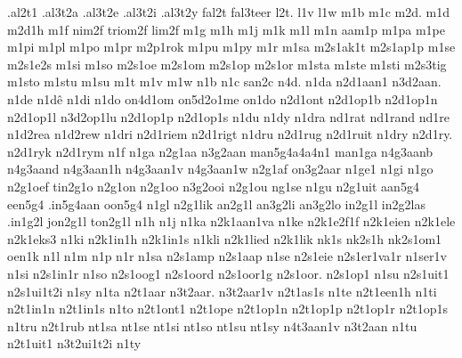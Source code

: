 {.al2t1
.al3t2a
.al3t2e
.al3t2i
.al3t2y
%
fal2t
fal3teer
l2t.
%
l1v
l1w
%
m1b
m1c
m2d.
m1d
m2d1h
m1f
nim2f
triom2f
lim2f
m1g
m1h
m1j
m1k
m1l
m1n
aam1p
m1pa
m1pe
m1pi
m1pl
m1po
m1pr
m2p1rok
m1pu
m1py
m1r
m1sa
m2s1ak1t
m2s1ap1p
m1se
m2s1e2s
m1si
m1so
m2s1oe
m2s1om
m2s1op
m2s1or
m1sta
m1ste
m1sti
m2s3tig
m1sto
m1stu
m1su
m1t
m1v
m1w
%
%
n1b
n1c
san2c
n4d.
n1da
n2d1aan1
n3d2aan.
n1de
n1dê
n1di
n1do
on4d1om
on5d2o1me
on1do
n2d1ont
n2d1op1b
n2d1op1n
n2d1op1l
n3d2op1lu
n2d1op1p
n2d1op1s
n1du
n1dy
n1dra
nd1rat
nd1rand
nd1re
n1d2rea
n1d2rew
n1dri
n2d1riem
n2d1rigt
n1dru
n2d1rug
n2d1ruit
n1dry
n2d1ry.
n2d1ryk
n2d1rym
n1f
%
n1ga
n2g1aa
n3g2aan
man5g4a4a4n1
man1ga
n4g3aanb
n4g3aand
n4g3aan1h
n4g3aan1v
n4g3aan1w
n2g1af
on3g2aar
n1ge1
n1gi
n1go
n2g1oef
tin2g1o
n2g1on
n2g1oo
n3g2ooi
n2g1ou
ng1se
n1gu
n2g1uit
aan5g4
een5g4
.in5g4aan
oon5g4
n1gl
n2g1lik
an2g1l
an3g2li
an3g2lo
in2g1l
in2g2las
.in1g2l
jon2g1l
ton2g1l
%
n1h
n1j
n1ka
n2k1aan1va
n1ke
n2k1e2f1f
n2k1eien
n2k1ele
n2k1eks3
n1ki
n2k1in1h
n2k1in1s
n1kli
n2k1lied
n2k1lik
nk1s
nk2s1h
nk2s1om1
oen1k
n1l
n1m
n1p
n1r
n1sa
n2s1amp
n2s1aap
n1se
n2s1eie
n2s1er1va1r
n1ser1v
n1si
n2s1in1r
n1so
n2s1oog1
n2s1oord
n2s1oor1g
n2s1oor.
n2s1op1
n1su
n2s1uit1
n2s1ui1t2i
n1sy
n1ta
n2t1aar
n3t2aar.
n3t2aar1v
n2t1as1s
n1te
n2t1een1h
n1ti
n2t1in1n
n2t1in1s
n1to
n2t1ont1
n2t1ope
n2t1op1n
n2t1op1p
n2t1op1r
n2t1op1s
n1tru
n2t1rub
nt1sa
nt1se
nt1si
nt1so
nt1su
nt1sy
n4t3aan1v
n3t2aan
n1tu
n2t1uit1
n3t2ui1t2i
n1ty
}

